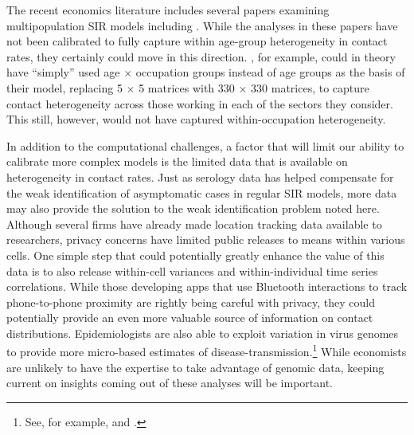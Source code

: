 \documentclass[11pt]{article}
\begin{document}
The recent economics literature includes several papers examining multipopulation SIR models including \citet{acemoglu2020multi, baqaee2020reopening, favero2020restarting}. While the analyses in these papers have not been 
calibrated to fully capture within age-group heterogeneity in contact rates, they certainly could move in this direction. \citet{baqaee2020reopening},
for example, could in theory have ``simply'' used age $\times$ occupation groups instead of age groups as the basis of their model, replacing 5 $\times$ 5 matrices with 330 $\times$ 330 matrices, to capture contact heterogeneity 
across those working in each of the sectors they consider. This still, however, would not have captured within-occupation heterogeneity. 

In addition to the computational challenges, a factor that will limit our ability to calibrate more complex models is the 
limited data that is available on heterogeneity in contact rates. Just as serology data has helped compensate for the weak identification of asymptomatic cases in regular SIR models, more data may also provide
the solution to the weak identification problem noted here. Although several firms have already made location tracking 
data available to researchers, privacy concerns have limited public releases to means within various cells. One simple 
step that could potentially greatly enhance the value of
this data is to also release within-cell variances and within-individual time series correlations. While those developing apps that use Bluetooth interactions to track
phone-to-phone proximity are rightly being careful with privacy, they could potentially provide an even more 
valuable source of information on contact distributions. Epidemiologists are also able to exploit variation in virus genomes
to provide more micro-based estimates of disease-transmission.\footnote{See, for example, \citet{miller2020full} and \citet{worobey2020emergence}.} 
While economists are unlikely to have the expertise
to take advantage of genomic data, keeping current on insights coming out of these analyses will be important.

\newpage{}

\baselineskip 13.6pt


\printbibliography

% 
% 
\end{document}
